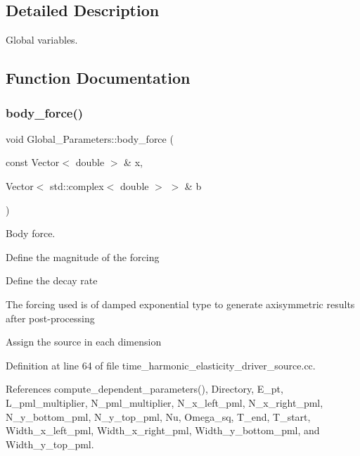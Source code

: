 \subsection{Detailed Description}
Global variables. 

\subsection{Function Documentation}
\mbox{\label{namespaceGlobal__Parameters_a1db5d755b9fc9faa6cd74f4747264acc}} 
\subsubsection{\texorpdfstring{body\+\_\+force()}{body\_force()}}
{\footnotesize\ttfamily void Global\+\_\+\+Parameters\+::body\+\_\+force (\begin{DoxyParamCaption}\item[{const Vector$<$ double $>$ \&}]{x,  }\item[{Vector$<$ std\+::complex$<$ double $>$ $>$ \&}]{b }\end{DoxyParamCaption})}



Body force. 

Define the magnitude of the forcing

Define the decay rate

The forcing used is of damped exponential type to generate axisymmetric results after post-\/processing

Assign the source in each dimension 

Definition at line 64 of file time\+\_\+harmonic\+\_\+elasticity\+\_\+driver\+\_\+source.\+cc.



References compute\+\_\+dependent\+\_\+parameters(), Directory, E\+\_\+pt, L\+\_\+pml\+\_\+multiplier, N\+\_\+pml\+\_\+multiplier, N\+\_\+x\+\_\+left\+\_\+pml, N\+\_\+x\+\_\+right\+\_\+pml, N\+\_\+y\+\_\+bottom\+\_\+pml, N\+\_\+y\+\_\+top\+\_\+pml, Nu, Omega\+\_\+sq, T\+\_\+end, T\+\_\+start, Width\+\_\+x\+\_\+left\+\_\+pml, Width\+\_\+x\+\_\+right\+\_\+pml, Width\+\_\+y\+\_\+bottom\+\_\+pml, and Width\+\_\+y\+\_\+top\+\_\+pml.

\mbox{\label{namespaceGlobal__Parameters_aafb6ae2e2642a42a7c8ce999837d18b1}} 
